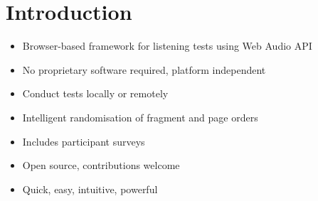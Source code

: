 \vspace{-0.8cm}
\section{Introduction}

\begin{itemize}%
	\item Browser-based framework for listening tests using Web Audio API
	\item No proprietary software required, platform independent
	\item Conduct tests locally or remotely
	\item Intelligent randomisation of fragment and page orders
	\item Includes participant surveys
	\item Open source, contributions welcome
	\item Quick, easy, intuitive, powerful
\end{itemize}